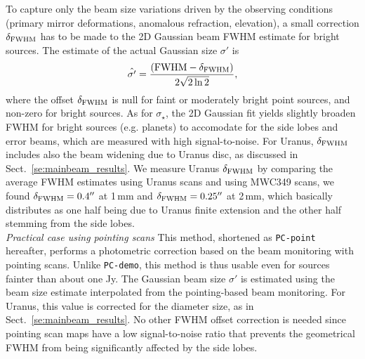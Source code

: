 To capture only the beam size variations driven by the
observing conditions (primary mirror deformations, anomalous
refraction, elevation), a small correction $\delta_{\rm{FWHM}}$ has to be made to
the 2D Gaussian beam FWHM estimate for bright sources. The estimate of the
actual Gaussian size $\sigma '$ is
\begin{equation}
  \hat{\sigma '} = \frac{(\rm{FWHM} - \delta_{\rm{FWHM}})}{2\sqrt{2 \ln{2}}}, 
\end{equation} 
where the offset $\delta_{\rm{FWHM}}$ is null for faint or moderately
bright point sources, and non-zero for bright sources.
As for $\sigma_\star$, the 2D Gaussian fit yields slightly broaden
FWHM for bright sources (e.g. planets) to accomodate
for the side lobes and error beams, which are measured with high signal-to-noise.
For Uranus, $\delta_{\rm{FWHM}}$ includes also the beam widening due
to Uranus disc, as discussed in Sect.~\ref{se:mainbeam_results}.
We measure Uranus $\delta_{\rm{FWHM}}$
by comparing the average %
FWHM estimates using Uranus
scans and using MWC349 scans, we found $\delta_{\rm{FWHM}} = 0.4''$ at
1\,mm and $\delta_{\rm{FWHM}} = 0.25''$ at 2\,mm, which basically
distributes as one half being due to Uranus finite extension and the
other half stemming from the side lobes.\\

\noindent \emph{Practical case using pointing scans} This method,
shortened as {\tt PC-point} hereafter, performs a photometric correction
based on the beam monitoring with pointing scans. Unlike
{\tt PC-demo}, this method is thus usable even for sources fainter
than about one Jy. The Gaussian beam size $\sigma '$ is estimated
using the beam size estimate interpolated from the pointing-based beam
monitoring. {\lp For Uranus, this value is corrected for the diameter
size, as in Sect.~\ref{se:mainbeam_results}.}  
No other FWHM offset correction is needed since pointing scan maps
have a low signal-to-noise ratio that prevents the geometrical FWHM
from being significantly affected by the side lobes.


